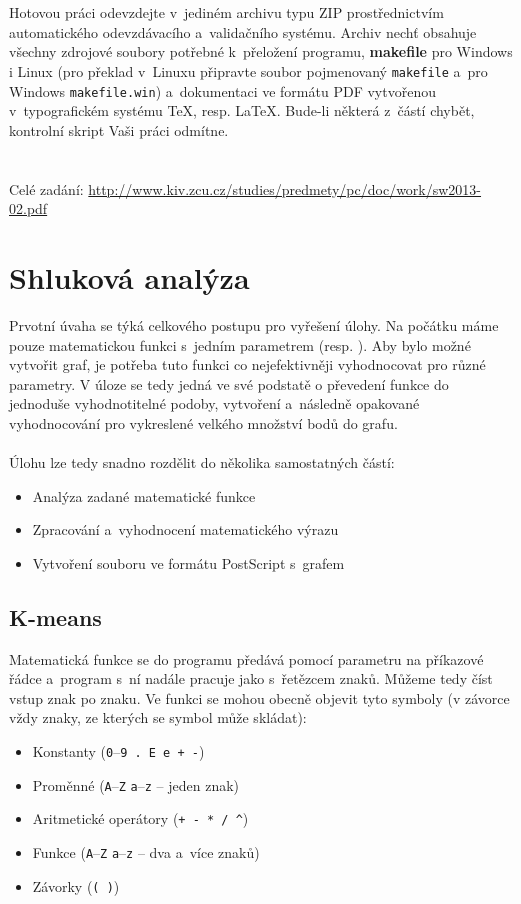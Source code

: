 \documentclass[pdftex,a4paper]{article}
\begin{document}
\\\\
Hotovou práci odevzdejte v~jediném archivu typu ZIP prostřednictvím automatického odevzdávacího a~validačního systému. Archiv nechť obsahuje všechny zdrojové soubory potřebné k~přeložení programu, \textbf{makefile} pro Windows i Linux (pro překlad v~Linuxu připravte soubor pojmenovaný \texttt{makefile} a~pro Windows \texttt{makefile.win}) a~dokumentaci ve formátu PDF vytvořenou v~typografickém systému \TeX, resp. \LaTeX. Bude-li některá z~částí chybět, kontrolní skript Vaši práci odmítne.
\\\\\\
Celé zadání: \url{http://www.kiv.zcu.cz/studies/predmety/pc/doc/work/sw2013-02.pdf}






\newpage
\section{Shluková analýza}

Prvotní úvaha se týká celkového postupu pro vyřešení úlohy. Na počátku máme pouze matematickou funkci s~jedním parametrem (resp. ). Aby bylo možné vytvořit graf, je potřeba tuto funkci co nejefektivněji vyhodnocovat pro různé parametry. V úloze se tedy jedná ve své podstatě o převedení funkce do jednoduše vyhodnotitelné podoby, vytvoření  a~následně opakované vyhodnocování pro vykreslené velkého množství bodů do grafu.
\\\\
Úlohu lze tedy snadno rozdělit do několika samostatných částí:
\begin{itemize}
\item Analýza zadané matematické funkce
\item Zpracování a~vyhodnocení matematického výrazu
\item Vytvoření souboru ve formátu \textsf{PostScript} s~grafem 
\end{itemize}


\subsection{K-means}\label{subsect:analyza}

Matematická funkce se do programu předává pomocí parametru na příkazové řádce a~program s~ní nadále pracuje jako s~řetězcem znaků. Můžeme tedy číst vstup znak po znaku. Ve funkci se mohou obecně objevit tyto symboly (v závorce vždy znaky, ze kterých se symbol může skládat):
\begin{itemize}
\item Konstanty (\texttt{0}--\texttt{9 . E e + -})
\item Proměnné (\texttt{A}--\texttt{Z} \texttt{a}--\texttt{z} -- jeden znak)
\item Aritmetické operátory (\texttt{+ - * / \^{}})
\item Funkce (\texttt{A}--\texttt{Z} \texttt{a}--\texttt{z} -- dva a~více znaků)
\item Závorky (\texttt{( )})
\end{itemize}~
\end{document}
